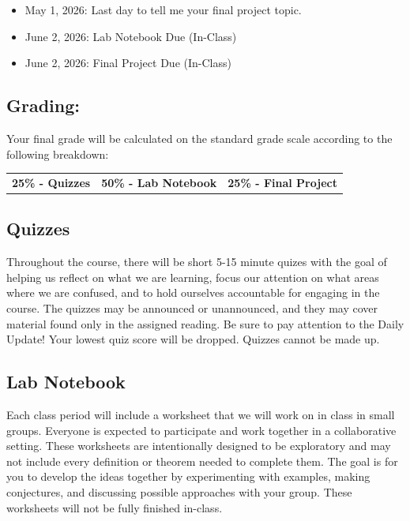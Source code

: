 \documentclass[11pt,letterpaper]{article}
\begin{document}
\begin{itemize}
\item May 1, 2026: Last day to tell me your final project topic.
\item June 2, 2026: Lab Notebook Due (In-Class)
\item June 2, 2026: Final Project Due (In-Class)
\end{itemize}

\subsection*{Grading:}

Your final grade will be calculated on the standard grade scale according to the following breakdown:

\vspace{2pt}\begingroup\setlength{\fboxsep}{8pt}
\colorbox{Pale}{\begin{minipage}{\dimexpr\linewidth-16pt\relax}
\begin{tabularx}{\linewidth}{@{}XXX@{}}
{\sffamily\bfseries\color{Forest}25\% - Quizzes} & {\sffamily\bfseries\color{Forest}50\% - Lab Notebook} & {\sffamily\bfseries\color{Forest}25\% - Final Project}
\end{tabularx}\end{minipage}}\endgroup\vspace{3pt}

\subsection*{Quizzes}

Throughout the course, there will be short 5-15 minute quizes with the goal of helping us reflect on what we are learning, focus our attention on what areas where we are confused, and to hold ourselves accountable for engaging in the course. The quizzes may be announced or unannounced, and they may cover material found only in the assigned reading. Be sure to pay attention to the Daily Update! Your lowest quiz score will be dropped. Quizzes cannot be made up.

\subsection*{Lab Notebook}

Each class period will include a worksheet that we will work on in class in small groups. Everyone is expected to participate and work together in a collaborative setting. These worksheets are intentionally designed to be exploratory and may not include every definition or theorem needed to complete them. The goal is for you to develop the ideas together by experimenting with examples, making conjectures, and discussing possible approaches with your group. These worksheets will not be fully finished in-class.
\end{document}
